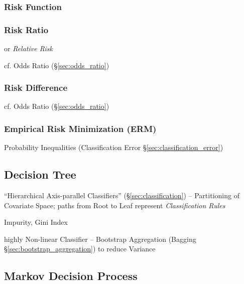 \subsubsection{Risk Function}\label{sec:risk_function}

\subsubsection{Risk Ratio}\label{sec:risk_ratio}

or \emph{Relative Risk}

cf. Odds Ratio (\S\ref{sec:odds_ratio})



\subsubsection{Risk Difference}\label{sec:risk_difference}

cf. Odds Ratio (\S\ref{sec:odds_ratio})



\subsubsection{Empirical Risk Minimization (ERM)}\label{sec:erm}

Probability Inequalities (Classification Error \S\ref{sec:classification_error})





\subsection{Decision Tree}\label{sec:decision_tree}

``Hierarchical Axis-parallel Classifiers'' (\S\ref{sec:classification}) --
Partitioning of Covariate Space; paths from Root to Leaf represent
\emph{Classification Rules}

Impurity, Gini Index

highly Non-linear Classifier --
Bootstrap Aggregation (Bagging \S\ref{sec:bootstrap_aggregation}) to reduce
Variance



\subsection{Markov Decision Process}\label{sec:markov_decision}


